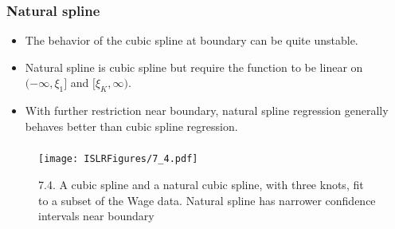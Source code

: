\documentclass{beamer}
\begin{document}
                   
                   \begin{frame}
                   	\frametitle{Natural spline  }
                   	\begin{itemize}
                   		\item The behavior of the cubic spline at boundary can be quite unstable.
                   		\item Natural spline is cubic spline but require the function to be linear
                   		on $(-\infty, \xi_1]$ and $[\xi_K, \infty)$. 
                   		\item With further restriction near boundary, natural spline regression
                   		generally behaves better than cubic spline regression.
                   		
                   		
                   	\end{itemize}
                   \end{frame} 
                  
               
                 \begin{frame}
                 	\frametitle{ }
                 	\begin{figure}
                 		\centering
                 		
                 		\centering
                 		\texttt{[image: ISLRFigures/7\_4.pdf]}
                 		\caption{7.4. A cubic spline and a natural cubic spline, with three knots, fit to
                 			a subset of the Wage data. Natural spline has narrower confidence intervals near boundary
                 		}
                 	\end{figure}
                 \end{frame}
                 
\end{document}
